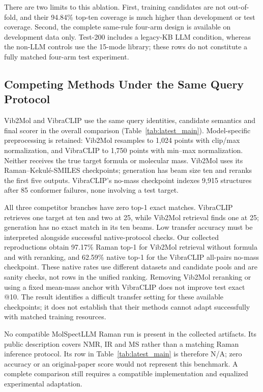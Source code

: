 There are two limits to this ablation. First, training candidates are not out-of-fold, and their 94.84\% top-ten coverage is much higher than development or test coverage. Second, the complete same-rule four-arm design is available on development data only. Test-200 includes a legacy-KB LLM condition, whereas the non-LLM controls use the 15-mode library; these rows do not constitute a fully matched four-arm test experiment.

\subsection{Competing Methods Under the Same Query Protocol}\label{sec:competitors}


Vib2Mol and VibraCLIP use the same query identities, candidate semantics and final scorer in the overall comparison (Table~\ref{tab:latest_main}). Model-specific preprocessing is retained: Vib2Mol resamples to 1,024 points with clip/max normalization, and VibraCLIP to 1,750 points with min--max normalization. Neither receives the true target formula or molecular mass. Vib2Mol uses its Raman--Kekul\'e-SMILES checkpoints; generation has beam size ten and reranks the first five outputs. VibraCLIP's no-mass checkpoint indexes 9,915 structures after 85 conformer failures, none involving a test target.

All three competitor branches have zero top-1 exact matches. VibraCLIP retrieves one target at ten and two at 25, while Vib2Mol retrieval finds one at 25; generation has no exact match in its ten beams. Low transfer accuracy must be interpreted alongside successful native-protocol checks. Our collected reproductions obtain 97.17\% Raman top-1 for Vib2Mol retrieval without formula and with reranking, and 62.59\% native top-1 for the VibraCLIP all-pairs no-mass checkpoint. These native rates use different datasets and candidate pools and are sanity checks, not rows in the unified ranking. Removing Vib2Mol reranking or using a fixed mean-mass anchor with VibraCLIP does not improve test exact @10. The result identifies a difficult transfer setting for these available checkpoints; it does not establish that their methods cannot adapt successfully with matched training resources.

No compatible MolSpectLLM Raman run is present in the collected artifacts. Its public description covers NMR, IR and MS rather than a matching Raman inference protocol. Its row in Table~\ref{tab:latest_main} is therefore N/A; zero accuracy or an original-paper score would not represent this benchmark. A complete comparison still requires a compatible implementation and equalized experimental adaptation.
